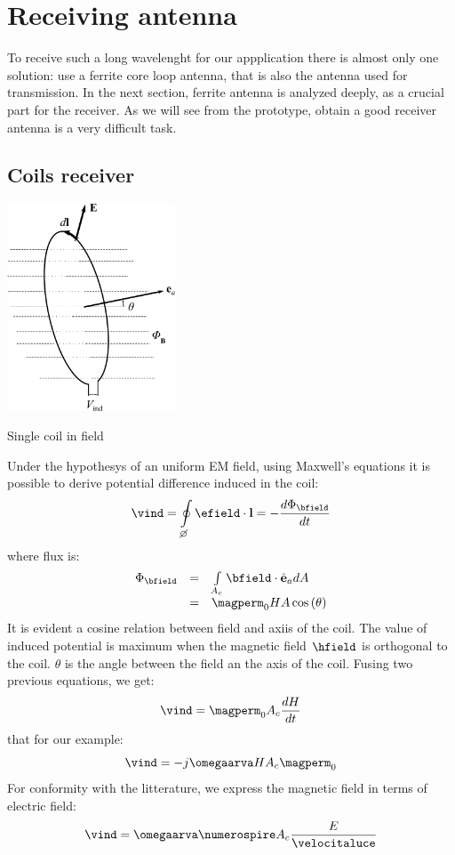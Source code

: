\section{Receiving antenna}

To receive such a long wavelenght for our appplication there is almost only one solution: use a ferrite core loop antenna, that is also the antenna used for transmission. In the next section, ferrite antenna is analyzed deeply, as a crucial part for the receiver. As we will see from the prototype, obtain a good receiver antenna is a very difficult task.

\subsection{Coils receiver}

\begin{marginfigure}
	\centering
	\includegraphics[width=5cm]{ch2/img/spira_singola.pdf}
	\caption{Single coil in field}
\end{marginfigure}
Under the hypothesys of an uniform EM field, using Maxwell's equations it is possible to derive potential difference induced in the coil:
\begin{equation}
\label{eq:tensioneindotta}
\vind = \oint\limits_{\diameter}\efield\cdot\mathbf{l} = -\dfrac{d\Phi_{\bfield}}{dt}
\end{equation}
where flux is:
\begin{equation}
\begin{array}{rcl}
\Phi_{\bfield} & = & \int\limits_{A_c} \bfield \cdot \hat{\mathbf{e}}_a dA \\
 & = & \magperm_0 H A \ccos{\theta}
\end{array}
\end{equation}
It is evident a cosine relation between field and axiis of the coil. The value of induced potential is maximum when the magnetic field $\hfield$ is orthogonal to the coil. $\theta$ is the angle between the field an the axis of the coil. Fusing two previous equations, we get:
\[
\vind = \magperm_0 A_c \dfrac{dH}{dt}
\]
that for our example:
\[
\vind = -j \omegaarva H A_c \magperm_0
\]
For conformity with the litterature, we express the magnetic field in terms of electric field:
\begin{equation}
\vind = \omegaarva \numerospire A_c \dfrac{E}{\velocitaluce}
\end{equation}

